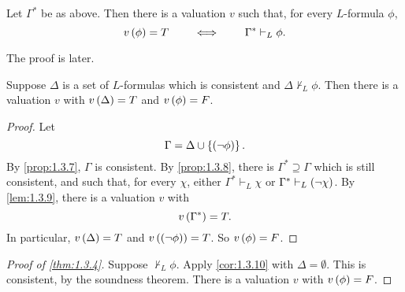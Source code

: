 \pagebreak


\begin{lemma}
\label{lem:1.3.9}
Let $ \Gamma^* $ be as above. Then there is a valuation $ v $ such that, for every $ L $-formula $ \phi $,
$$ v\left( \phi \right) = T \qquad \iff \qquad \Gamma^* \vdash_L \phi. $$
\end{lemma}

The proof is later.

\begin{corollary}
\label{cor:1.3.10}
Suppose $ \Delta $ is a set of $ L $-formulas which is consistent and $ \Delta \not\vdash_L \phi $. Then there is a valuation $ v $ with $ v\left( \Delta \right) = T $ and $ v\left( \phi \right) = F $.
\end{corollary}

\begin{proof}
Let
$$ \Gamma = \Delta \cup \left\{ \left( \neg \phi \right) \right\}. $$
By \ref{prop:1.3.7}, $ \Gamma $ is consistent. By \ref{prop:1.3.8}, there is $ \Gamma^* \supseteq \Gamma $ which is still consistent, and such that, for every $ \chi $, either $ \Gamma^* \vdash_L \chi $ or $ \Gamma^* \vdash_L \left( \neg \chi \right) $. By \ref{lem:1.3.9}, there is a valuation $ v $ with
$$ v\left( \Gamma^* \right) = T. $$
In particular, $ v\left( \Delta \right) = T $ and $ v\left( \left( \neg \phi \right) \right) = T $. So $ v\left( \phi \right) = F $.
\end{proof}

\begin{proof}[Proof of \ref{thm:1.3.4}]
Suppose $ \not\vdash_L \phi $. Apply \ref{cor:1.3.10} with $ \Delta = \emptyset $. This is consistent, by the soundness theorem. There is a valuation $ v $ with $ v\left( \phi \right) = F $.
\end{proof}

